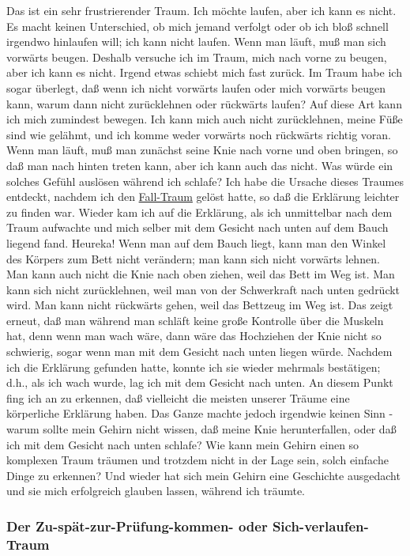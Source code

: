 Das ist ein sehr frustrierender Traum.
Ich möchte laufen, aber ich kann es nicht.
Es macht keinen Unterschied, ob mich jemand verfolgt oder ob ich bloß schnell irgendwo hinlaufen will; ich kann nicht laufen.
Wenn man läuft, muß man sich vorwärts beugen.
Deshalb versuche ich im Traum, mich nach vorne zu beugen, aber ich kann es nicht.
Irgend etwas schiebt mich fast zurück.
Im Traum habe ich sogar überlegt, daß wenn ich nicht vorwärts laufen oder mich vorwärts beugen kann, warum dann nicht zurücklehnen oder rückwärts laufen?
Auf diese Art kann ich mich zumindest bewegen.
Ich kann mich auch nicht zurücklehnen, meine Füße sind wie gelähmt, und ich komme weder vorwärts noch rückwärts richtig voran.
Wenn man läuft, muß man zunächst seine Knie nach vorne und oben bringen, so daß man nach hinten treten kann, aber ich kann auch das nicht.
Was würde ein solches Gefühl auslösen während ich schlafe?
Ich habe die Ursache dieses Traumes entdeckt, nachdem ich den \hyperref[c3_5b]{Fall-Traum} gelöst hatte, so daß die Erklärung leichter zu finden war.
Wieder kam ich auf die Erklärung, als ich unmittelbar nach dem Traum aufwachte und mich selber mit dem Gesicht nach unten auf dem Bauch liegend fand. Heureka!
Wenn man auf dem Bauch liegt, kann man den Winkel des Körpers zum Bett nicht verändern; man kann sich nicht vorwärts lehnen.
Man kann auch nicht die Knie nach oben ziehen, weil das Bett im Weg ist.
Man kann sich nicht zurücklehnen, weil man von der Schwerkraft nach unten gedrückt wird.
Man kann nicht rückwärts gehen, weil das Bettzeug im Weg ist.
Das zeigt erneut, daß man während man schläft keine große Kontrolle über die Muskeln hat, denn wenn man wach wäre, dann wäre das Hochziehen der Knie nicht so schwierig, sogar wenn man mit dem Gesicht nach unten liegen würde.
Nachdem ich die Erklärung gefunden hatte, konnte ich sie wieder mehrmals bestätigen; d.h., als ich wach wurde, lag ich mit dem Gesicht nach unten.
An diesem Punkt fing ich an zu erkennen, daß vielleicht die meisten unserer Träume eine körperliche Erklärung haben.
Das Ganze machte jedoch irgendwie keinen Sinn - warum sollte mein Gehirn nicht wissen, daß meine Knie herunterfallen, oder daß ich mit dem Gesicht nach unten schlafe?
Wie kann mein Gehirn einen so komplexen Traum träumen und trotzdem nicht in der Lage sein, solch einfache Dinge zu erkennen?
Und wieder hat sich mein Gehirn eine Geschichte ausgedacht und sie mich erfolgreich glauben lassen, während ich träumte.


\subsubsection{Der Zu-spät-zur-Prüfung-kommen- oder Sich-verlaufen-Traum}
\label{c3_5d}

